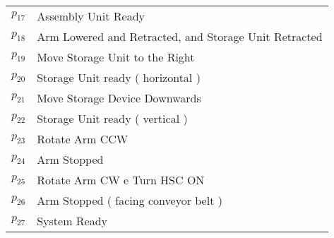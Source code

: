\begin{table}[htbp]
\begin{tabular}{M{5cm}M{10cm}}
\hyperlink{partialNet:p17}{\hypertarget{partialTable:p17}{$p_{17}$}} & Assembly Unit Ready\\
\hyperlink{partialNet:p18}{\hypertarget{partialTable:p18}{$p_{18}$}} & Arm Lowered and Retracted, and Storage Unit Retracted\\
\hyperlink{partialNet:p19}{\hypertarget{partialTable:p19}{$p_{19}$}} & Move Storage Unit to the Right\\
\hyperlink{partialNet:p20}{\hypertarget{partialTable:p20}{$p_{20}$}} & Storage Unit ready ( horizontal )\\
\hyperlink{partialNet:p21}{\hypertarget{partialTable:p21}{$p_{21}$}} & Move Storage Device Downwards\\
\hyperlink{partialNet:p22}{\hypertarget{partialTable:p22}{$p_{22}$}} & Storage Unit ready ( vertical )\\
\hyperlink{partialNet:p23}{\hypertarget{partialTable:p23}{$p_{23}$}} & Rotate Arm CCW\\
\hyperlink{partialNet:p24}{\hypertarget{partialTable:p24}{$p_{24}$}} & Arm Stopped\\
\hyperlink{partialNet:p25}{\hypertarget{partialTable:p25}{$p_{25}$}} & Rotate Arm CW e Turn HSC ON\\
\hyperlink{partialNet:p26}{\hypertarget{partialTable:p26}{$p_{26}$}} & Arm Stopped ( facing conveyor belt )\\
\hyperlink{partialNet:p27}{\hypertarget{partialTable:p27}{$p_{27}$}} & System Ready\\
\end{tabular}
\end{table}

